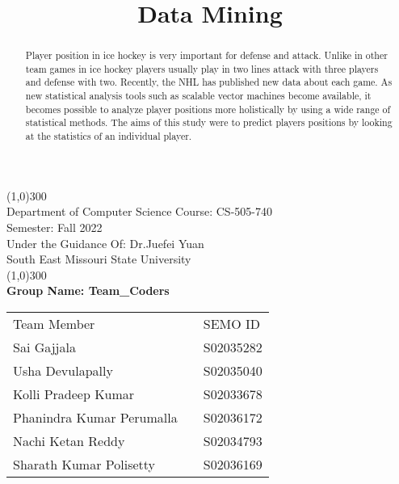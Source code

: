 \documentclass{report}
\title{Data Mining}
\begin{document}
\begin{titlepage}
	\begin{center}
    \line(1,0){300}\\
    [0.65cm]
    \huge Department of Computer Science Course: CS-505-740\\\large Semester: Fall 2022\\\large Under the Guidance Of:  Dr.Juefei Yuan\\ %
	\large South East Missouri State University\\
	\line(1,0){300}\\
	\centering\textbf{Group Name: Team\_Coders\\}
	\end{center}

    \begin{table}[H]
        \centering\begin{tabular}{lll}
        Team Member               &  & SEMO ID   \\
        Sai Gajjala               &  & S02035282 \\
        Usha Devulapally          &  & S02035040 \\
        Kolli Pradeep Kumar       &  & S02033678 \\
        Phanindra Kumar Perumalla &  & S02036172 \\
        Nachi Ketan Reddy         &  & S02034793 \\
        Sharath Kumar Polisetty   &  & S02036169
        \end{tabular}
    \end{table}

\end{titlepage}

\begin{abstract}
\par Player position in ice hockey is very important for defense and attack. Unlike in other team games in 
ice hockey players usually play in two lines attack with three players and defense with two. Recently, the NHL has 
published new data about each game. As new statistical analysis tools such as scalable vector
machines become available, it becomes possible to analyze player positions more holistically by using a wide
range of statistical methods. The aims of this study were to predict players positions by looking at 
the statistics of an individual player.
\end{abstract}

\tableofcontents
\end{document}

